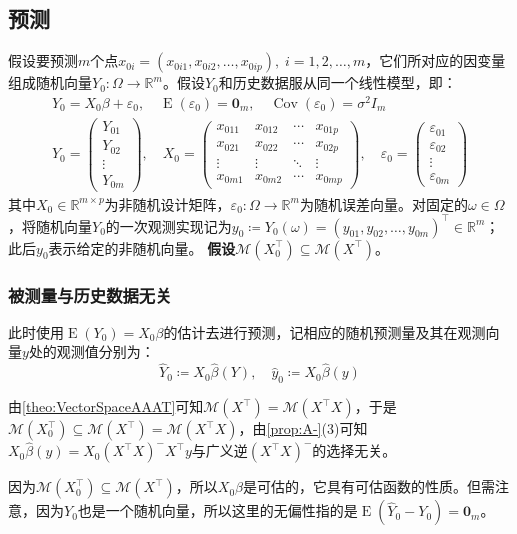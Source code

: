 \subsection{预测}
\label{def:LinearModelForcast}
假设要预测$m$个点$x_{0i}=(x_{0i1},x_{0i2},\dots,x_{0ip}),\;i=1,2,\dots,m$，它们所对应的因变量组成随机向量$Y_0:\Omega\to\mathbb{R}^m$。假设$Y_0$和历史数据服从同一个线性模型，即：
\begin{gather*}
	Y_0=X_0\beta+\varepsilon_0,\quad\operatorname{E}(\varepsilon_0)=\mathbf{0}_m,\quad\operatorname{Cov}(\varepsilon_0)=\sigma^2I_m \\
	Y_0=
	\begin{pmatrix}
		Y_{01} \\
		Y_{02} \\
		\vdots \\
		Y_{0m}
	\end{pmatrix},\quad
	X_0=
	\begin{pmatrix}
		x_{011} & x_{012} & \cdots & x_{01p} \\
		x_{021} & x_{022} & \cdots & x_{02p} \\
		\vdots & \vdots & \ddots & \vdots \\
		x_{0m1} & x_{0m2} & \cdots & x_{0mp} 
	\end{pmatrix},\quad
	\varepsilon_0=
	\begin{pmatrix}
		\varepsilon_{01} \\
		\varepsilon_{02} \\
		\vdots \\
		\varepsilon_{0m}
	\end{pmatrix}
\end{gather*}
其中$X_0\in\mathbb{R}^{m\times p}$为非随机设计矩阵，$\varepsilon_0:\Omega\to\mathbb{R}^m$为随机误差向量。对固定的$\omega\in\Omega$，将随机向量$Y_0$的一次观测实现记为$y_0\coloneq Y_0(\omega)=(y_{01},y_{02},\dots,y_{0m})^{\top}\in\mathbb{R}^m$；此后$y_0$表示给定的非随机向量。
\textbf{假设$\mathcal{M}(X_0^{\top})\subseteq\mathcal{M}(X^{\top})$}。
\subsubsection{被测量与历史数据无关}
\begin{derivation}
	此时使用$\operatorname{E}(Y_0)=X_0\beta$的估计去进行预测，记相应的随机预测量及其在观测向量$y$处的观测值分别为：
	\begin{equation*}
		\widehat{Y}_0\coloneq X_0\hat{\beta}(Y),\quad
		\hat{y}_0\coloneq X_0\hat{\beta}(y)
	\end{equation*}\par
	由\cref{theo:VectorSpaceAAAT}可知$\mathcal{M}(X^{\top})=\mathcal{M}(X^{\top}X)$，于是$\mathcal{M}(X_0^{\top})\subseteq\mathcal{M}(X^{\top})=\mathcal{M}(X^{\top}X)$，由\cref{prop:A-}(3)可知$X_0\hat{\beta}(y)=X_0(X^{\top}X)^-X^{\top}y$与广义逆$(X^{\top}X)^-$的选择无关。\par
	因为$\mathcal{M}(X_0^{\top})\subseteq\mathcal{M}(X^{\top})$，所以$X_0\beta$是可估的，它具有可估函数的性质。但需注意，因为$Y_0$也是一个随机向量，所以这里的无偏性指的是$\operatorname{E}(\widehat{Y}_0-Y_0)=\mathbf{0}_m$。
\end{derivation}
